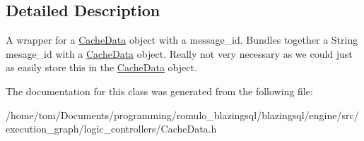 \subsection{Detailed Description}
A wrapper for a \hyperlink{classral_1_1cache_1_1CacheData}{Cache\+Data} object with a message\+\_\+id. Bundles together a String mesage\+\_\+id with a \hyperlink{classral_1_1cache_1_1CacheData}{Cache\+Data} object. Really not very necessary as we could just as easily store this in the \hyperlink{classral_1_1cache_1_1CacheData}{Cache\+Data} object. 

The documentation for this class was generated from the following file\+:\begin{DoxyCompactItemize}
\item 
/home/tom/\+Documents/programming/romulo\+\_\+blazingsql/blazingsql/engine/src/execution\+\_\+graph/logic\+\_\+controllers/Cache\+Data.\+h\end{DoxyCompactItemize}

